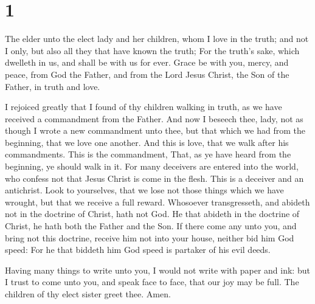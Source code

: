 \hypertarget{section}{%
\section{1}\label{section}}

 The elder unto the elect lady and her children, whom I
love in the truth; and not I only, but also all they that have known the
truth;  For the truth's sake, which dwelleth in us, and
shall be with us for ever.  Grace be with you, mercy, and
peace, from God the Father, and from the Lord Jesus Christ, the Son of
the Father, in truth and love.

 I rejoiced greatly that I found of thy children walking
in truth, as we have received a commandment from the Father.
 And now I beseech thee, lady, not as though I wrote a new
commandment unto thee, but that which we had from the beginning, that we
love one another.  And this is love, that we walk after
his commandments. This is the commandment, That, as ye have heard from
the beginning, ye should walk in it.  For many deceivers
are entered into the world, who confess not that Jesus Christ is come in
the flesh. This is a deceiver and an antichrist.  Look to
yourselves, that we lose not those things which we have wrought, but
that we receive a full reward.  Whosoever transgresseth,
and abideth not in the doctrine of Christ, hath not God. He that abideth
in the doctrine of Christ, he hath both the Father and the Son.
 If there come any unto you, and bring not this doctrine,
receive him not into your house, neither bid him God speed:
 For he that biddeth him God speed is partaker of his
evil deeds.

 Having many things to write unto you, I would not write
with paper and ink: but I trust to come unto you, and speak face to
face, that our joy may be full.  The children of thy
elect sister greet thee. Amen.
